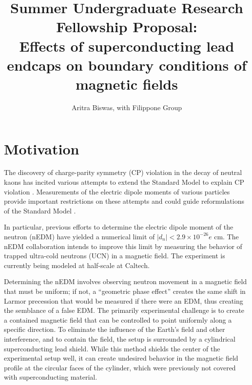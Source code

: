 \documentclass[twocolumn,aps,prb,citeautoscript]{revtex4-1}
\begin{document}
\title{Summer Undergraduate Research Fellowship Proposal:\\
Effects of superconducting lead endcaps on boundary conditions of
magnetic fields}
\author{Aritra Biswas, with Filippone Group}



\maketitle

\section{Motivation}
The discovery of charge-parity symmetry (CP) violation 
in the decay of neutral kaons has incited various attempts to extend the
Standard Model to explain CP violation \cite{cpv}. Measurements of the electric
dipole moments of various particles provide important restrictions on these
attempts and could guide reformulations of the Standard Model \cite{ill}.

In particular, previous efforts \cite{ill} to determine the electric dipole
moment  of the neutron (nEDM)
have yielded a numerical limit of $|d_n| < 2.9 \times 10^{-26}e\text{ cm}$.
The nEDM collaboration intends to
improve this limit \cite{krl} by measuring the behavior of trapped
ultra-cold neutrons (UCN) in a magnetic field.
The experiment is currently being modeled at
half-scale at Caltech.

Determining the nEDM involves observing neutron movement in a magnetic field
that must be uniform; if not, a
``geometric phase effect'' creates the same shift in Larmor precession
that would be measured if there were an EDM, thus creating the semblance
of a false EDM\cite{coil}.
The primarily experimental challenge is to create a contained magnetic field
that can be controlled to point uniformly along a specific direction. To
eliminate
the influence of the Earth's field and other interference, and to contain
the field, the setup is surrounded by a cylindrical
superconducting lead shield. While
this method shields the center of the experimental setup well,
it can create undesired behavior
in the magnetic field profile at the circular faces of the cylinder, which
were previously not covered with superconducting material.
\end{document}
